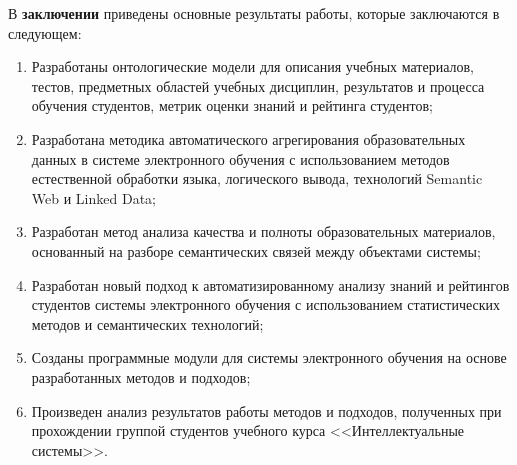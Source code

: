 В \textbf{заключении} приведены основные результаты работы, которые заключаются в следующем:
\begin{enumerate}
 \item Разработаны онтологические модели для описания учебных материалов, тестов, предметных областей учебных дисциплин, результатов и процесса обучения студентов, метрик оценки знаний и рейтинга студентов;
 \item Разработана методика автоматического агрегирования образовательных данных в системе электронного обучения с использованием методов естественной обработки языка, логического вывода, технологий Semantic Web и Linked Data;
 \item Разработан метод анализа качества и полноты образовательных материалов, основанный на разборе семантических связей между объектами системы;
  \item Разработан новый подход к автоматизированному анализу знаний и рейтингов студентов системы электронного обучения с использованием статистических методов и семантических технологий;
  \item Созданы программные модули для системы электронного обучения на основе разработанных методов и подходов;
  \item Произведен анализ результатов работы методов и подходов, полученных при прохождении группой студентов учебного курса <<Интеллектуальные системы>>.
  \end{enumerate}




\renewcommand{\refname}{Научные работы по теме диссертации}
\nocite{*}


%